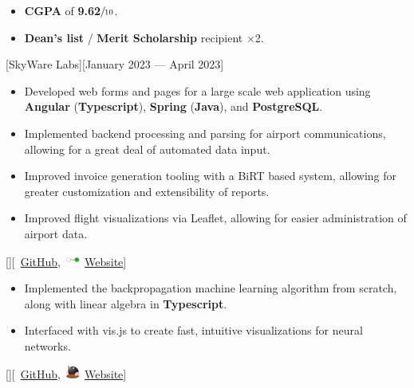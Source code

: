 \documentclass{article}
\begin{document}
\begin{itemize}
	\item \textbf{CGPA} of \textbf{9.62}\(\sfrac{}{10}\).
	\item \textbf{Dean's list} / \textbf{Merit Scholarship} recipient \(\times\)2.
\end{itemize}

\vspace*{\fill}


[SkyWare Labs][January 2023 --- April 2023]

\begin{itemize}
	\item Developed web forms and pages for a large scale web application using
	      \textbf{Angular} (\textbf{Typescript}), \textbf{Spring}
	      (\textbf{Java}), and \textbf{PostgreSQL}.
	\item Implemented backend processing and parsing for airport communications,
	      allowing for a great deal of automated data input.
	\item Improved invoice generation tooling with a BiRT based system, allowing
	      for greater customization and extensibility of reports.
	\item Improved flight visualizations via Leaflet, allowing for easier
	      administration of airport data.
\end{itemize}

\vspace*{\fill}


[][\faGithub\
	\href{https://github.com/kinseyda/neural-playground}{GitHub},\
	\includegraphics[height=1.5ex]{neural-icon-small.png}\
	\href{https://kinseyda.github.io/neural-playground/}{Website}]

\begin{itemize}
	\item Implemented the backpropagation machine learning algorithm from
	      scratch, along with linear algebra in \textbf{Typescript}.
	\item Interfaced with vis.js to create fast, intuitive visualizations for
	      neural networks.
\end{itemize}

[][\faGithub\
	\href{https://github.com/kinseyda/moles}{GitHub},\
	\includegraphics[height=1.5ex]{mole-icon-small.png}\
	\href{https://kinseyda.github.io/moles/}{Website}]
\end{document}
